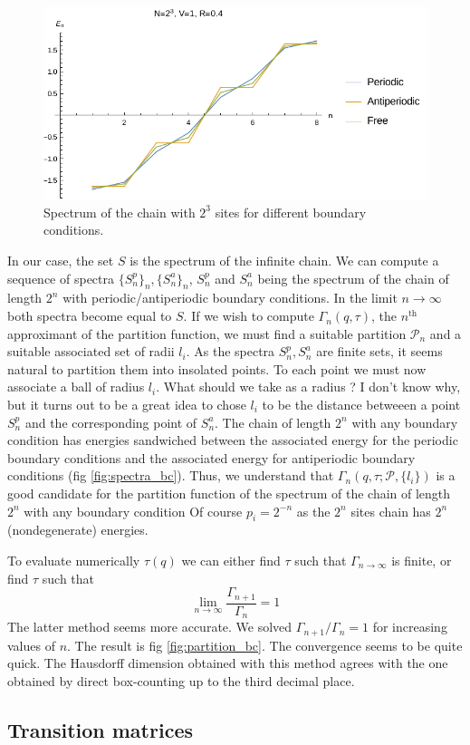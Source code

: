 \documentclass[11pt]{article}
\begin{document}
\begin{figure}[htp]
\centering
  \includegraphics[width=.8\linewidth]{data/spectra_vs_bc_hchain.pdf}
  \caption{Spectrum of the chain with $2^3$ sites for different boundary conditions.}
  \label{fig:spectra_bc}
\end{figure}

In our case, the set $S$ is the spectrum of the infinite chain. 
We can compute a sequence of spectra $\{S^p_n\}_n, \{S^a_n\}_n$, $S^p_n$ and $S^a_n$ being the spectrum of the chain of length $2^n$ with periodic/antiperiodic boundary conditions. In the limit $n\rightarrow \infty$ both spectra become equal to $S$.
If we wish to compute $\Gamma_n(q,\tau)$, the $n^\text{th}$ approximant of the partition function, we must find a suitable partition $\mathcal{P}_n$ and a suitable associated set of radii $l_i$.
As the spectra $S^p_n, S^a_n$ are finite sets, it seems natural to partition them into insolated points. To each point we must now associate a ball of radius $l_i$. What should we take as a radius ? I don't know why, but it turns out to be a great idea to chose $l_i$ to be the distance betweeen a point $S^p_n$ and the corresponding point of $S^a_n$. 
The chain of length $2^n$ with any boundary condition has energies sandwiched between the associated energy for the periodic boundary conditions and the associated energy for antiperiodic boundary conditions (fig \eqref{fig:spectra_bc}). Thus, we understand that $\Gamma_n(q,\tau;\mathcal{P},\{l_i\})$ is a good candidate for the partition function of the spectrum of the chain of length $2^n$ with any boundary condition
Of course $p_i = 2^{-n}$ as the $2^n$ sites chain has $2^n$ (nondegenerate) energies.

To evaluate numerically $\tau(q)$ we can either find $\tau$ such that $\Gamma_{n\rightarrow \infty}$ is finite, or find $\tau$ such that 
\begin{equation}
	\lim_{n\rightarrow \infty} \frac{\Gamma_{n+1}}{\Gamma_n} = 1
\end{equation}
The latter method seems more accurate. We solved $\Gamma_{n+1}/\Gamma_n = 1$ for increasing values of $n$. The result is fig \eqref{fig:partition_bc}. The convergence seems to be quite quick. 
The Hausdorff dimension obtained with this method agrees with the one obtained by direct box-counting up to the third decimal place.

\subsection{Transition matrices}
{}

\end{document}
